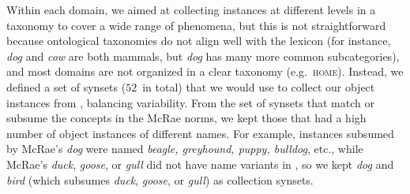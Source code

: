 Within each domain, we aimed at collecting instances at different levels in a taxonomy to cover a wide range of phenomena, but this is not straightforward because ontological taxonomies do not align well with the lexicon (for instance, \textit{dog} and \textit{cow} are both mammals, but \textit{dog} has many more common subcategories), and most domains are not organized in a clear taxonomy %
(e.g.\ \textsc{home}).
Instead, we defined a set of synsets ($52$\ in total) that we would use to collect our object instances from \vg, balancing variability.
From the set of synsets that match or subsume the concepts in the McRae norms, we kept those that had a high number of \vg object instances of different names.
For example, \vg instances subsumed by McRae's \textsl{dog} were named \textsl{beagle, greyhound, puppy, bulldog}, etc., while McRae's \textsl{duck}, \textsl{goose}, or \textsl{gull} did not have name variants in \vg, so we kept \textsl{dog} and \textsl{bird} (which subsumes \textsl{duck}, \textsl{goose}, or \textsl{gull}) as collection synsets.


